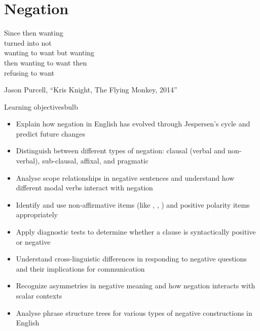 \chapter{Negation}

\epigraph{Since then wanting\\
turned into not\\
wanting to want but wanting\\
then wanting to want then\\
refusing to want}{Jason Purcell, \enquote{Kris Knight, The Flying Monkey, 2014}}

\begin{tblsframedsymbol}{Learning objectives}{bulb}
\begin{itemize}[noitemsep, leftmargin=*]
    \item Explain how negation in English has evolved through Jespersen's cycle and predict future changes
    \item Distinguish between different types of negation: clausal (verbal and non-verbal), sub-clausal, affixal, and pragmatic
    \item Analyse scope relationships in negative sentences and understand how different modal verbs interact with negation
    \item Identify and use non-affirmative items (like , , ) and positive polarity items appropriately
    \item Apply diagnostic tests to determine whether a clause is syntactically positive or negative
    \item Understand cross-linguistic differences in responding to negative questions and their implications for communication
    \item Recognize asymmetries in negative meaning and how negation interacts with scalar contexts
    \item Analyse phrase structure trees for various types of negative constructions in English
\end{itemize}
\end{tblsframedsymbol}

